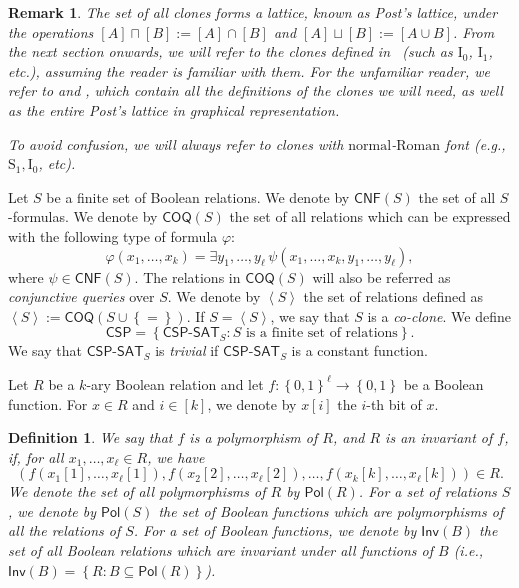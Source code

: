 \documentclass[10pt,a4paper]{article}
\newtheorem{definition}[theorem]{Definition}
\newtheorem{remark}[theorem]{Remark}
\newcommand{\defx}[1]{\emph{#1}}
\newcommand{\CNF}{\mathsf{CNF}}
\def\sseq{\subseteq}
\newcommand{\set}[1]{\left\{#1\right\}}
\newcommand{\brkt}[1]{\left\langle #1 \right\rangle}
\newcommand{\blt}{\set{0,1}}
\newcommand{\CSPf}[1]{\mathsf{CSP}\text{-}\mathsf{SAT}_{#1}}
\newcommand{\CSP}{\mathsf{CSP}}
\newcommand{\COQ}{\mathsf{COQ}}
\newcommand{\Pol}{\mathsf{Pol}}
\newcommand{\Inv}{\mathsf{Inv}}
\newcommand{\ccln}[1]{\brkt{#1}}
\newcommand{\clonefont}[1]{\mathrm{#1}}
\begin{document}
\begin{remark}
    \label{rk:post_lattice}
    The set of all clones forms a lattice, known as
    \defx{Post's lattice},
    under the operations
    $[A] \sqcap [B] := [A] \cap [B]$
    and
    $[A] \sqcup [B] := [A \cup B]$.
    From the next section onwards,
    we will refer to the clones defined in~\cite{playing_one}
    (such as $\clonefont{I_0}$, $\clonefont{I_1}$, etc.),
    assuming the reader is familiar with them.
    For the unfamiliar reader, we refer to  and 
    ,
    which contain all the definitions of the clones we will need,
    as well as the entire Post's lattice in graphical representation.
    
    To avoid confusion, we will always refer to clones with
    $\clonefont{normal}$-$\clonefont{Roman}$ font (e.g.,
    $\clonefont{S_1}, \clonefont{I_0}$, etc).
\end{remark}

Let $S$ be a finite set of Boolean relations.
We denote by $\CNF(S)$ the set of all $S$-formulas.
We denote by $\COQ(S)$ 
the set of all relations which can be expressed
with the following type of formula $\varphi$:
\begin{equation*}
    \varphi(x_1,\dots,x_k) = \exists y_1,\dots,y_\ell
    \,
    \psi(x_1,\dots,x_k,y_1,\dots,y_\ell),
\end{equation*}
where $\psi \in \CNF(S)$.
The relations in $\COQ(S)$ will also be referred as \emph{conjunctive
queries} over $S$.
We denote by $\ccln{S}$ the set of relations
defined as
$\ccln{S} := \COQ(S \cup \set{=})$.
If $S = \ccln{S}$, we say that $S$ is a \emph{co-clone}.
We define 
$$\CSP = \set{\CSPf{S} : \text{$S$ is a finite set of relations}}.$$
We say that $\CSPf{S}$ is \emph{trivial}
if $\CSPf{S}$ is a constant function.


Let $R$ be a $k$-ary Boolean relation 
and
let $f : \blt^\ell \to \blt$ be a Boolean function.
For $x \in R$ and $i \in [k]$, we denote by $x[i]$
the $i$-th bit of $x$.
\begin{definition}
    \label{def:polymorphism}
    We say that $f$ is a
    \defx{polymorphism} of $R$,
    and $R$ is 
    \defx{an invariant of $f$},
    if, for all $x_1, \dots, x_\ell \in R$, we have
    \begin{equation*}
        (
            f(x_1[1],\dots,x_{\ell}[1]),
            f(x_2[2],\dots,x_{\ell}[2]),
            \dots,
            f(x_k[k],\dots,x_{\ell}[k])
        )
        \in
        R.
    \end{equation*}
    We denote the set of all polymorphisms of $R$ by $\Pol(R)$.
    For a set of relations $S$,
    we denote by $\Pol(S)$ the set of Boolean functions
    which are polymorphisms of all the relations of $S$.
    For a set of Boolean functions, we denote by
    $\Inv(B)$ the set of all Boolean relations which are invariant
    under all functions of $B$ (i.e.,
    $\Inv(B) = \set{R : B \sseq \Pol(R)}$).
\end{definition}
\end{document}
